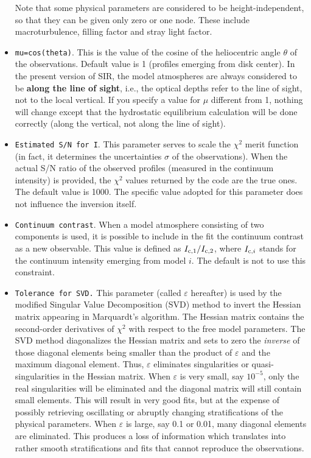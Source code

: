 \begin{itemize}
Note that some physical parameters are considered to be
height-independent, so that they can be given only zero or one node.
These include macroturbulence, filling factor and stray light factor.

\item {\tt mu=cos(theta)}. This is the value of the cosine of the
heliocentric angle $\theta$ of the observations. Default value is 1
(profiles emerging from disk center). In the present version of 
SIR, the model atmospheres are always considered to be {\bf along 
the line of sight}, i.e., the optical depths refer to the line of 
sight, not to the local vertical. If you specify a value for $\mu$ 
different from 1, nothing will change except that the hydrostatic 
equilibrium calculation will be done correctly (along the vertical, 
not along the line of sight).  

\item {\tt Estimated S/N for I}. This parameter serves to scale the
$\chi^2$ merit function (in fact, it determines the uncertainties
$\sigma$ of the observations). When the actual S/N ratio of the
observed profiles (measured in the continuum intensity) is provided,
the $\chi^2$ values returned by the code are the true ones. The default
value is 1000. The specific value adopted for this parameter does not
influence the inversion itself.

\item {\tt Continuum contrast}. When a model atmosphere consisting of
two components is used, it is possible to include in the fit the
continuum contrast as a new observable.  This value is defined as
$I_{{\rm c},1}/I_{{\rm c},2}$, where $I_{{\rm c},i}$ stands for the
continuum intensity emerging from model $i$. The default is not to use
this constraint.

\item {\tt Tolerance for SVD.} This parameter (called $\varepsilon$
hereafter) is used by the modified Singular Value Decomposition (SVD)
method to invert the Hessian matrix appearing in Marquardt's algorithm.
The Hessian matrix contains the second-order derivatives of $\chi^2$
with respect to the free model parameters. The SVD method diagonalizes
the Hessian matrix and sets to zero the {\em inverse} of those diagonal
elements being smaller than the product of $\varepsilon$ and the
maximum diagonal element.  Thus, $\varepsilon$ eliminates singularities
or quasi-singularities in the Hessian matrix.  When $\varepsilon$ is
very small, say $10^{-5}$, only the real singularities will be
eliminated and the diagonal matrix will still contain small elements.
This will result in very good fits, but at the expense of possibly
retrieving oscillating or abruptly changing stratifications of the
physical parameters. When $\varepsilon$ is large, say 0.1 or 0.01, many
diagonal elements are eliminated. This produces a loss of information
which translates into rather smooth stratifications and fits that
cannot reproduce the observations.


\end{itemize}
